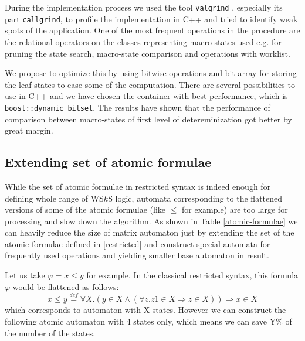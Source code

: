  During the implementation process we used the tool \texttt{valgrind}
 \cite{valgrind}, especially its part \texttt{callgrind}, to profile the
 implementation in C++ and tried to identify weak spots of the application.
 One of the most frequent operations in the procedure are the relational
 operators on the classes representing macro-states used e.g. for pruning the state search,
 macro-state comparison and operations with worklist.
 
 We propose to optimize this by using bitwise operations and bit array for
 storing the leaf states to ease some of the computation. There are several
 possibilities to use in C++ \cite{bitwise} and we have chosen the container
 with best performance, which is \texttt{boost::dynamic\_bitset}. The results
 have shown that the performance of comparison between macro-states of first
 level of detereminization got better by great margin.
 
 \subsection{Extending set of atomic formulae}
 
 While the set of atomic formulae in restricted syntax is indeed enough for
 defining whole range of WS$k$S logic, automata corresponding to the flattened
 versions of some of the atomic formulae (like $\leq$ for example) are too large
 for processing and slow down the algorithm. As shown in Table
 \ref{atomic-formulae} we can heavily reduce the size of matrix automaton just
 by extending the set of the atomic formulae defined in \ref{restricted} and
 construct special automata for frequently used operations and yielding smaller
 base automaton in result.
 
 \noindent\hrulefill
 \begin{example}
 Let us take $\varphi = x \leq y$ for example. In the classical restricted
 syntax, this formula $\varphi$ would be flattened as follows:
 \begin{equation}
  x \leq y \overset{\mathit{def}}{=} \forall X. (y \in X \wedge (\forall z. z1
  \in X \Rightarrow z \in X)) \Rightarrow x \in X
 \end{equation} 
 which corresponds to automaton with X states. However we can construct the
 following atomic automaton with 4 states only, which means we can save Y\% of
 the number of the states.
 \end{example}
 
 \noindent\hrulefill
 
